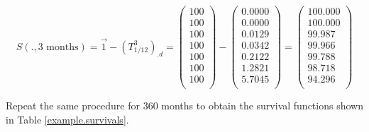 \documentclass[a4paper,12pt,final]{article}
\begin{document}
\begin{displaymath}
S(.,3 \textrm{ months}) = \vec{1} - (T_{1/12}^3)_{.d} = 
\left( 
\begin{array}{c}
 100 \\
 100 \\
 100 \\
 100 \\
 100 \\
 100 \\
 100 \\
\end{array}
\right)
 - 
\left( 
\begin{array}{c}
 0.0000 \\
 0.0000 \\
 0.0129 \\
 0.0342 \\
 0.2122 \\
 1.2821 \\
 5.7045 \\
\end{array}
\right)
=
\left( 
\begin{array}{c}
 100.000 \\
 100.000 \\
  99.987 \\
  99.966 \\
  99.788 \\
  98.718 \\
  94.296 \\
\end{array}
\right)
\end{displaymath}

Repeat the same procedure for $360$ months to obtain the survival
functions shown in Table \ref{example.survivals}.

\clearpage 
\end{document}
